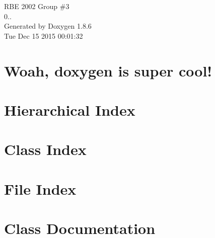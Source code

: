 \documentclass[twoside]{book}
\newcommand{\clearemptydoublepage}{%
  \newpage{\pagestyle{empty}\cleardoublepage}%
}
\begin{document}
\hypersetup{pageanchor=false}
\begin{titlepage}
\vspace*{7cm}
\begin{center}%
{\Large R\-B\-E 2002 Group \#3 \\[1ex]\large 0.. }\\
\vspace*{1cm}
{\large Generated by Doxygen 1.8.6}\\
\vspace*{0.5cm}
{\small Tue Dec 15 2015 00:01:32}\\
\end{center}
\end{titlepage}
\clearemptydoublepage
\tableofcontents
\clearemptydoublepage
{}
\hypersetup{pageanchor=true}

\chapter{Woah, doxygen is super cool!}
\label{index}\hypertarget{index}{}
\chapter{Hierarchical Index}

\chapter{Class Index}

\chapter{File Index}

\chapter{Class Documentation}





























\end{document}
